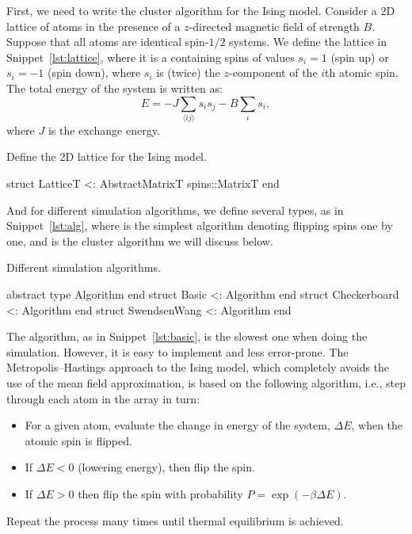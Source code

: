 First, we need to write the cluster algorithm for the Ising model.
Consider a 2D lattice of atoms in the presence of a \(z\)-directed magnetic field of strength
\(B\). Suppose that all atoms are identical spin-\(1/2\) systems.
We define the lattice in Snippet~\ref{lst:lattice},
where it is a  containing spins of values \(s_i = 1\) (spin up) or
\(s_i = -1\) (spin down), where \(s_i\) is (twice) the \(z\)-component of the \(i\)th
atomic spin. The total energy of the system is written as:
%
\begin{equation}
    E = -J \sum_{\langle i j \rangle} s_i s_j - B \sum_{i} s_i,
\end{equation}
%
where \(J\) is the exchange energy.

%
\begin{algorithm}
    \caption{Define the 2D lattice for the Ising model.}
    \label{lst:lattice}
    \begin{juliacode}
        struct Lattice{T} <: AbstractMatrix{T}
            spins::Matrix{T}
        end
    \end{juliacode}
\end{algorithm}
%
And for different simulation algorithms, we define several types, as in
Snippet~\ref{lst:alg}, where  is the simplest algorithm
denoting flipping spins one by one, and  is the cluster
algorithm we will discuss below.

\begin{algorithm}
    \caption{Different simulation algorithms.}
    \label{lst:alg}
    \begin{juliacode}
        abstract type Algorithm end
        struct Basic <: Algorithm end
        struct Checkerboard <: Algorithm end
        struct SwendsenWang <: Algorithm end
    \end{juliacode}
\end{algorithm}

The  algorithm, as in Snippet~\ref{lst:basic},
is the slowest one when doing the simulation. However, it is easy to implement
and less error-prone.
The Metropolis--Hastings approach to the Ising model, which completely avoids the use of the mean
field approximation, is based on the following algorithm, i.e.,
step through each atom in the array in turn:
%
\begin{itemize}
    \item For a given atom, evaluate the change in energy of the system, \(\Delta E\), when
          the atomic spin is flipped.
    \item If \(\Delta E < 0\) (lowering energy), then flip the spin.
    \item If \(\Delta E > 0\) then flip the spin with probability
          \(P=\exp(-\beta \Delta E)\).
\end{itemize}
%
Repeat the process many times until thermal equilibrium is achieved.

